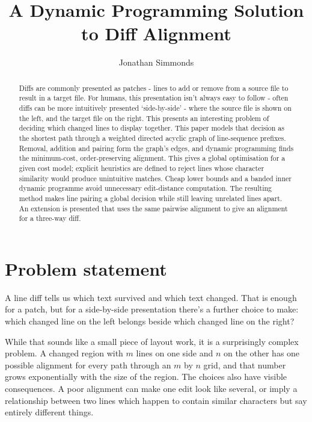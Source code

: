 \documentclass[
]{article}
\title{A Dynamic Programming Solution to Diff Alignment}
\author{Jonathan Simmonds}
\date{}
\begin{document}
\maketitle

\begin{abstract}
Diffs are commonly presented as patches - lines to add or remove from a
source file to result in a target file. For humans, this presentation
isn't always easy to follow - often diffs can be more intuitively
presented `side-by-side' - where the source file is shown on the left,
and the target file on the right. This presents an interesting problem
of deciding which changed lines to display together. This paper models
that decision as the shortest path through a weighted directed acyclic
graph of line-sequence prefixes. Removal, addition and pairing form the
graph's edges, and dynamic programming finds the minimum-cost,
order-preserving alignment. This gives a global optimisation for a given
cost model; explicit heuristics are defined to reject lines whose
character similarity would produce unintuitive matches. Cheap lower
bounds and a banded inner dynamic programme avoid unnecessary
edit-distance computation. The resulting method makes line pairing a
global decision while still leaving unrelated lines apart. An extension
is presented that uses the same pairwise alignment to give an alignment
for a three-way diff.
\end{abstract}

\hypertarget{problem-statement}{%
\section{Problem statement}\label{problem-statement}}

A line diff tells us which text survived and which text changed. That is
enough for a patch, but for a side-by-side presentation there's a
further choice to make: which changed line on the left belongs beside
which changed line on the right?

While that sounds like a small piece of layout work, it is a
surprisingly complex problem. A changed region with \(m\) lines on one
side and \(n\) on the other has one possible alignment for every path
through an \(m\) by \(n\) grid, and that number grows exponentially with
the size of the region. The choices also have visible consequences. A
poor alignment can make one edit look like several, or imply a
relationship between two lines which happen to contain similar
characters but say entirely different things.
\end{document}
